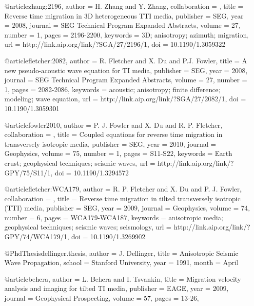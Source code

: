 @article{zhang:2196,
author = {H. Zhang and Y. Zhang},
collaboration = {},
title = {Reverse time migration in 3{D} heterogeneous {TTI} media},
publisher = {SEG},
year = {2008},
journal = {SEG Technical Program Expanded Abstracts},
volume = {27},
number = {1},
pages = {2196-2200},
keywords = {3{D}; anisotropy; azimuth; migration},
url = {http://link.aip.org/link/?SGA/27/2196/1},
doi = {10.1190/1.3059322}
}

@article{fletcher:2082,
  author =	 {R. Fletcher and X. Du and P.J. Fowler},
  title =	 {A new pseudo-acoustic wave equation for {TI} media},
  publisher =	 {SEG},
  year =	 2008,
  journal =	 {SEG Technical Program Expanded Abstracts},
  volume =	 27,
  number =	 1,
  pages =	 {2082-2086},
  keywords =	 {acoustic; anisotropy; finite difference; modeling;
                  wave equation},
  url =		 {http://link.aip.org/link/?SGA/27/2082/1},
  doi =		 {10.1190/1.3059301}
}




@article{fowler2010,
author = {P. J. Fowler and X. Du and R. P. Fletcher},
collaboration = {},
title = {Coupled equations for reverse time migration in transversely isotropic media},
publisher = {SEG},
year = {2010},
journal = {Geophysics},
volume = {75},
number = {1},
pages = {S11-S22},
keywords = {Earth crust; geophysical techniques; seismic waves},
url = {http://link.aip.org/link/?GPY/75/S11/1},
doi = {10.1190/1.3294572}
}







@article{fletcher:WCA179,
author = {R. P. Fletcher and X. Du and P. J. Fowler},
collaboration = {},
title = {Reverse time migration in tilted transversely isotropic (TTI) media},
publisher = {SEG},
year = {2009},
journal = {Geophysics},
volume = {74},
number = {6},
pages = {WCA179-WCA187},
keywords = {anisotropic media; geophysical techniques; seismic waves; seismology},
url = {http://link.aip.org/link/?GPY/74/WCA179/1},
doi = {10.1190/1.3269902}
}







@PhdThesis{dellinger.thesis,
  author =	 {J. Dellinger},
  title =	 {Anisotropic Seismic Wave Propagation},
  school =	 {Stanford University},
  year =	 1991,
  month =	 {April}
}

@article{behera,
  author =	 {L. Behera and I. Tsvankin},
  title =	 {Migration velocity analysis and imaging for tilted
                  {TI} media},
  publisher =	 {EAGE},
  year =	 2009,
  journal =	 {Geophysical Prospecting},
  volume =	 57,
  pages =	 {13-26},
}

